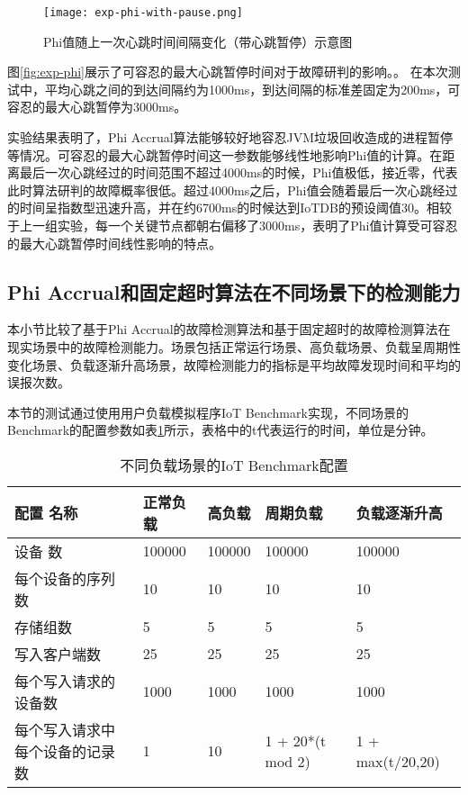\begin{figure}
    \centering
    \texttt{[image: exp-phi-with-pause.png]}
    \caption{Phi值随上一次心跳时间间隔变化（带心跳暂停）示意图}
    \label{fig:exp-phi-with-pause}
\end{figure}

图\ref{fig:exp-phi}展示了可容忍的最大心跳暂停时间对于故障研判的影响。。
在本次测试中，平均心跳之间的到达间隔约为1000ms，到达间隔的标准差固定为200ms，可容忍的最大心跳暂停为3000ms。

实验结果表明了，Phi Accrual算法能够较好地容忍JVM垃圾回收造成的进程暂停等情况。可容忍的最大心跳暂停时间这一参数能够线性地影响Phi值的计算。在距离最后一次心跳经过的时间范围不超过4000ms的时候，Phi值极低，接近零，代表此时算法研判的故障概率很低。超过4000ms之后，Phi值会随着最后一次心跳经过的时间呈指数型迅速升高，并在约6700ms的时候达到IoTDB的预设阈值30。相较于上一组实验，每一个关键节点都朝右偏移了3000ms，表明了Phi值计算受可容忍的最大心跳暂停时间线性影响的特点。


\subsection{Phi Accrual和固定超时算法在不同场景下的检测能力}
本小节比较了基于Phi Accrual的故障检测算法和基于固定超时的故障检测算法在现实场景中的故障检测能力。场景包括正常运行场景、高负载场景、负载呈周期性变化场景、负载逐渐升高场景，故障检测能力的指标是平均故障发现时间和平均的误报次数。

本节的测试通过使用用户负载模拟程序IoT Benchmark实现，不同场景的Benchmark的配置参数如表\ref{tab:extended_columns}所示，表格中的t代表运行的时间，单位是分钟。

\begin{table}[h!]
    \centering
    \caption{不同负载场景的IoT Benchmark配置}
    \label{tab:extended_columns}
    \begin{tabular}{lllll}
        \toprule
        配置 名称 & 正常负载 & 高负载 & 周期负载 & 负载逐渐升高 \\
        \midrule
        设备 数 & 100000 & 100000 & 100000 & 100000 \\
        每个设备的序列数 & 10 & 10 & 10 & 10  \\
        存储组数 & 5 & 5 & 5 & 5 \\
        写入客户端数 & 25 & 25 & 25 & 25 \\
        每个写入请求的设备数 & 1000 & 1000 & 1000 & 1000 \\
        每个写入请求中每个设备的记录数 & 1 & 10 & 1 + 20*(t mod 2) & 1 + max(t/20,20) \\
        \bottomrule
    \end{tabular}
\end{table}

